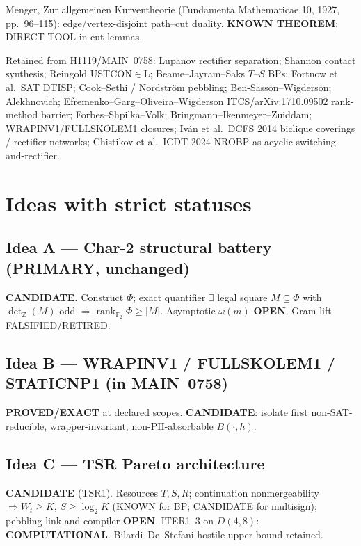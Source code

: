 \documentclass[11pt]{article}
\begin{document}
Menger, Zur allgemeinen Kurventheorie (Fundamenta Mathematicae 10, 1927, pp.~96--115):
edge/vertex-disjoint path--cut duality. \textbf{KNOWN THEOREM}; DIRECT TOOL in cut lemmas.

Retained from H1119/MAIN~0758: Lupanov rectifier separation; Shannon contact synthesis;
Reingold USTCON$\in$L; Beame--Jayram--Saks $T$--$S$ BPs; Fortnow et al.\ SAT DTISP;
Cook--Sethi / Nordstr\"om pebbling; Ben-Sasson--Wigderson; Alekhnovich;
Efremenko--Garg--Oliveira--Wigderson ITCS/arXiv:1710.09502 rank-method barrier;
Forbes--Shpilka--Volk; Bringmann--Ikenmeyer--Zuiddam; WRAPINV1/FULLSKOLEM1 closures;
Iv\'an et al.\ DCFS 2014 biclique coverings / rectifier networks;
Chistikov et al.\ ICDT 2024 NROBP-as-acyclic switching-and-rectifier.

\section*{Ideas with strict statuses}
\subsection*{Idea A --- Char-2 structural battery (PRIMARY, unchanged)}
\textbf{CANDIDATE.} Construct $\Phi$; exact quantifier
$\exists$ legal square $M\subseteq\Phi$ with $\det_{\mathbb Z}(M)$ odd
$\Rightarrow\operatorname{rank}_{\mathbb F_2}\Phi\ge|M|$. Asymptotic $\omega(m)$ \textbf{OPEN}.
Gram lift FALSIFIED/RETIRED.

\subsection*{Idea B --- WRAPINV1 / FULLSKOLEM1 / STATICNP1 (in MAIN~0758)}
\textbf{PROVED/EXACT} at declared scopes.
\textbf{CANDIDATE}: isolate first non-SAT-reducible, wrapper-invariant, non-PH-absorbable $B(\cdot,h)$.

\subsection*{Idea C --- TSR Pareto architecture}
\textbf{CANDIDATE} (TSR1). Resources $T,S,R$; continuation nonmergeability $\Rightarrow W_t\ge K$,
$S\ge\log_2 K$ (KNOWN for BP; CANDIDATE for multisign); pebbling link and compiler \textbf{OPEN}.
ITER1--3 on $D(4,8)$: \textbf{COMPUTATIONAL}. Bilardi--De~Stefani hostile upper bound retained.
\end{document}

